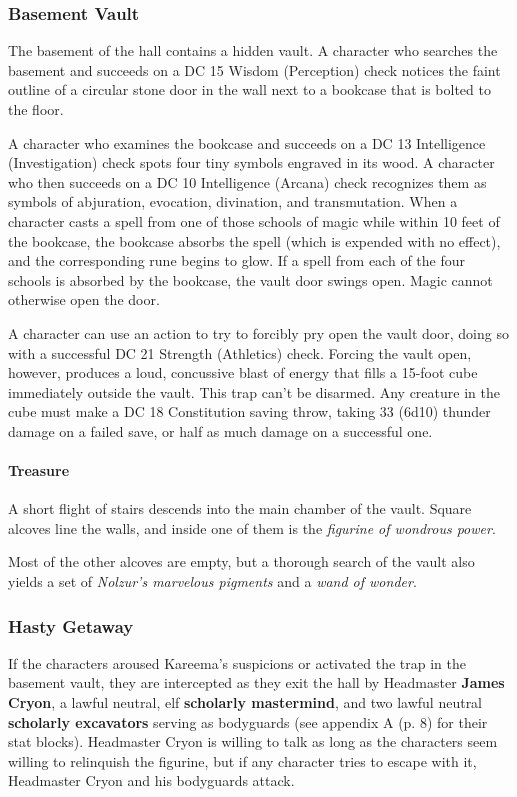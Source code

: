\documentclass[letterpaper, 11pt, bg=full, twocolumn]{dndbook}
\begin{document}
\subsubsection{Basement Vault}

The basement of the hall contains a hidden vault. A character who searches the basement and succeeds on a DC 15 Wisdom (Perception) check notices the faint outline of a circular stone door in the wall next to a bookcase that is bolted to the floor.

A character who examines the bookcase and succeeds on a DC 13 Intelligence (Investigation) check spots four tiny symbols engraved in its wood. A character who then succeeds on a DC 10 Intelligence (Arcana) check recognizes them as symbols of abjuration, evocation, divination, and transmutation. When a character casts a spell from one of those schools of magic while within 10 feet of the bookcase, the bookcase absorbs the spell (which is expended with no effect), and the corresponding rune begins to glow. If a spell from each of the four schools is absorbed by the bookcase, the vault door swings open. Magic cannot otherwise open the door.

A character can use an action to try to forcibly pry open the vault door, doing so with a successful DC 21 Strength (Athletics) check. Forcing the vault open, however, produces a loud, concussive blast of energy that fills a 15-foot cube immediately outside the vault. This trap can't be disarmed. Any creature in the cube must make a DC 18 Constitution saving throw, taking 33 (6d10) thunder damage on a failed save, or half as much damage on a successful one.

\paragraph{Treasure}

A short flight of stairs descends into the main chamber of the vault. Square alcoves line the walls, and inside one of them is the \textit{figurine of wondrous power}.

Most of the other alcoves are empty, but a thorough search of the vault also yields a set of \textit{Nolzur's marvelous pigments} and a \textit{wand of wonder}.

\subsubsection{Hasty Getaway}

If the characters aroused Kareema's suspicions or activated the trap in the basement vault, they are intercepted as they exit the hall by Headmaster \textbf{James Cryon}, a lawful neutral, elf \textbf{scholarly mastermind}, and two lawful neutral \textbf{scholarly excavators} serving as bodyguards (see appendix A (p. 8) for their stat blocks). Headmaster Cryon is willing to talk as long as the characters seem willing to relinquish the figurine, but if any character tries to escape with it, Headmaster Cryon and his bodyguards attack.
\end{document}
